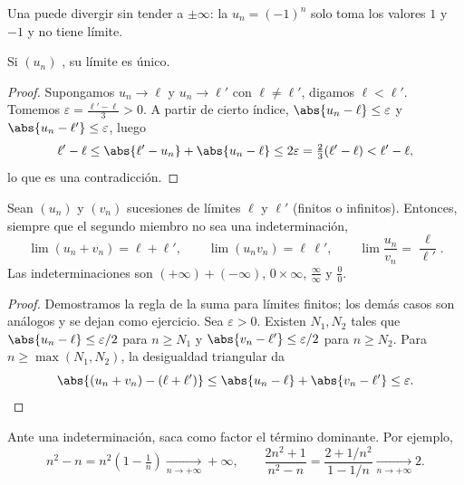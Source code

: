 \begin{remark}
Una  puede divergir sin tender a $\pm\infty$: la 
$u_n = (-1)^n$ solo toma los valores $1$ y $-1$ y no tiene límite.
\end{remark}

\begin{proposition}\label{prop:g12:seq:uniqueness}
Si $(u_n)$ , su límite es único.
\end{proposition}

\begin{proof}
Supongamos $u_n \to \ell$ y $u_n \to \ell'$ con $\ell \neq \ell'$, digamos
$\ell < \ell'$. Tomemos $\varepsilon = \frac{\ell' - \ell}{3} > 0$. A
partir de cierto índice, $\abs{u_n - \ell} \leq \varepsilon$ y
$\abs{u_n - \ell'} \leq \varepsilon$, luego
\[
\ell' - \ell \leq \abs{\ell' - u_n} + \abs{u_n - \ell}
\leq 2\varepsilon = \tfrac{2}{3}(\ell' - \ell) < \ell' - \ell,
\]
lo que es una contradicción.
\end{proof}

\begin{proposition}\label{prop:g12:seq:operations}
Sean $(u_n)$ y $(v_n)$ sucesiones de límites $\ell$ y $\ell'$ (finitos o
infinitos). Entonces, siempre que el segundo miembro no sea una
indeterminación,
\[
\lim (u_n + v_n) = \ell + \ell', \qquad
\lim (u_n v_n) = \ell\,\ell', \qquad
\lim \frac{u_n}{v_n} = \frac{\ell}{\ell'}.
\]
Las indeterminaciones son $(+\infty) + (-\infty)$, $0 \times \infty$,
$\frac{\infty}{\infty}$ y $\frac{0}{0}$.
\end{proposition}

\begin{proof}
Demostramos la regla de la suma para límites finitos; los demás casos son
análogos y se dejan como ejercicio. Sea $\varepsilon > 0$. Existen
$N_1, N_2$ tales que $\abs{u_n - \ell} \leq \varepsilon/2$ para
$n \geq N_1$ y $\abs{v_n - \ell'} \leq \varepsilon/2$ para $n \geq N_2$.
Para $n \geq \max(N_1, N_2)$, la desigualdad triangular da
\[
\abs{(u_n + v_n) - (\ell + \ell')}
\leq \abs{u_n - \ell} + \abs{v_n - \ell'} \leq \varepsilon. \qedhere
\]
\end{proof}

\begin{method}\label{met:g12:seq:indeterminate}
Ante una indeterminación, saca como factor el término dominante. Por
ejemplo,
\[
n^2 - n = n^2\left(1 - \tfrac{1}{n}\right) \xrightarrow[n\to+\infty]{} +\infty,
\qquad
\frac{2n^2+1}{n^2 - n} = \frac{2 + 1/n^2}{1 - 1/n}
\xrightarrow[n\to+\infty]{} 2 .
\]
\end{method}

